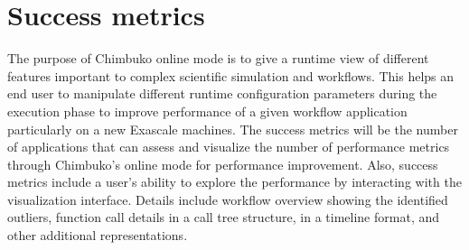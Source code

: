 \section{Success metrics}

The purpose of Chimbuko  online mode is to give a runtime view of different features important to complex scientific simulation and workflows. This helps an end user to manipulate different runtime configuration parameters during  the execution phase to improve  performance of a given workflow application particularly on a new Exascale machines. The success metrics  will be the number of applications that  can assess  and visualize the number of  performance metrics through Chimbuko's online mode for performance improvement.
Also, success metrics include a user's ability to explore the performance by interacting with the visualization interface. Details include workflow overview showing the identified outliers, function call details in a call tree structure, in a timeline format, and other additional representations. 
